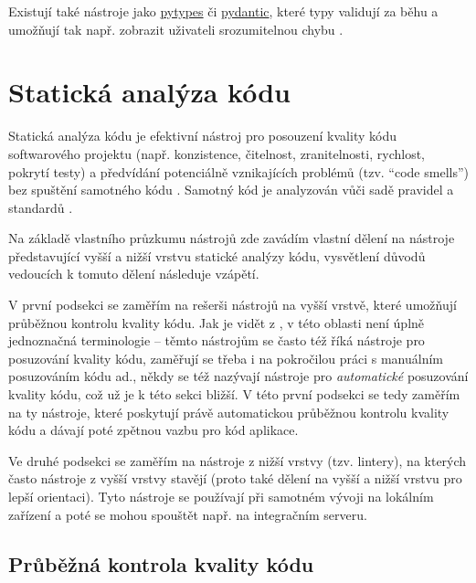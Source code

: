 Existují také nástroje jako \href{https://github.com/Stewori/pytypes}{pytypes} či \href{https://github.com/samuelcolvin/pydantic/}{pydantic}, které typy validují za běhu a umožňují tak např. zobrazit uživateli srozumitelnou chybu \cite{types-python-bernat, pydantic}. 


\section{Statická analýza kódu}\label{sec:statickaanalyzakodu}

Statická analýza kódu je efektivní nástroj pro posouzení kvality kódu softwarového projektu (např. konzistence, čitelnost, zranitelnosti, rychlost, pokrytí testy) a předvídání potenciálně vznikajících problémů (tzv. \enquote{code smells}) bez spuštění samotného kódu \cite{medium-devgurus, static-overops}. Samotný kód je analyzován vůči sadě pravidel a standardů \cite{static-overops}.

Na základě vlastního průzkumu nástrojů zde zavádím vlastní dělení na nástroje představující vyšší a nižší vrstvu statické analýzy kódu, vysvětlení důvodů vedoucích k tomuto dělení následuje vzápětí.

V první podsekci se zaměřím na rešerši nástrojů na vyšší vrstvě, které umožňují průběžnou kontrolu kvality kódu. Jak je vidět z \cite{guru-codereview, gh-awesomecodereview, medium-devgurus,stackshare-codereview, gh-awesomecodereview2}, v této oblasti není úplně jednoznačná terminologie -- těmto nástrojům se často též říká nástroje pro posuzování kvality kódu, zaměřují se třeba i na pokročilou práci s manuálním posuzováním kódu ad., někdy se též nazývají nástroje pro \textit{automatické} posuzování kvality kódu, což už je k této sekci bližší. V této první podsekci se tedy zaměřím na ty nástroje, které poskytují právě automatickou průběžnou kontrolu kvality kódu a dávají poté zpětnou vazbu pro kód aplikace.

Ve druhé podsekci se zaměřím na nástroje z nižší vrstvy (tzv. lintery), na kterých často nástroje z vyšší vrstvy stavějí (proto také dělení na vyšší a nižší vrstvu pro lepší orientaci). Tyto nástroje se používají při samotném vývoji na lokálním zařízení a poté se mohou spouštět např. na integračním serveru.

\subsection{Průběžná kontrola kvality kódu}

